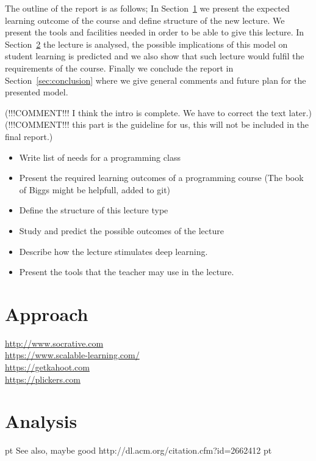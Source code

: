 \documentclass{article}
\begin{document}
The outline of the report is as follows; In Section~\ref{sec:plan} we present the expected learning outcome of the course and define structure of the new lecture. We present the tools and facilities needed in order to be able to give this lecture. In Section~\ref{sec:analysis} the lecture is analysed, the possible implications of this model on student learning is predicted and we also show that such lecture would fulfil the requirements of the course. Finally we conclude the report in Section~\ref{sec:conclusion} where we give general comments and future plan for the presented model.

(!!!COMMENT!!! I think the intro is complete. We have to correct the text later.)
(!!!COMMENT!!! this part is the guideline for us, this will not be included in the final report.)
\begin{itemize}
	\item Write list of needs for a programming class
	\item Present the required learning outcomes of a programming
          course (The book of Biggs might be helpfull, added to git)
	\item Define the structure of this lecture type
	\item Study and predict the possible outcomes of the lecture
	\item Describe how the lecture stimulates deep learning.
	\item Present the tools that the teacher may use in the lecture.
\end{itemize}

\section{Approach} %
\label{sec:plan}

\url{http://www.socrative.com}\\
\url{https://www.scalable-learning.com/}\\ %
\url{https://getkahoot.com}\\
\url{https://plickers.com}

\section{Analysis} %
\label{sec:analysis}



 pt
See also, maybe good
http://dl.acm.org/citation.cfm?id=2662412
 pt
\end{document}
